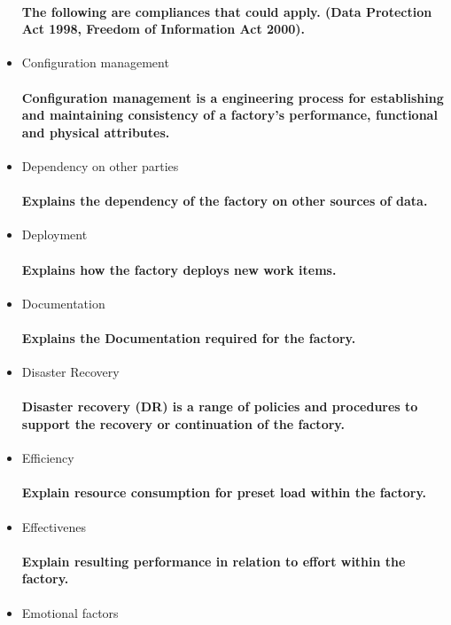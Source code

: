 \begin{itemize}
  \paragraph{The following are compliances that could apply. (Data Protection Act 1998, Freedom of Information Act 2000).}
  \item Configuration management
  \paragraph{Configuration management is a engineering process for establishing and maintaining consistency of a factory's performance, functional and physical attributes.}
  \item Dependency on other parties
  \paragraph{Explains the dependency of the factory on other sources of data.}
  \item Deployment
  \paragraph{Explains how the factory deploys new work items.}
  \item Documentation
  \paragraph{Explains the Documentation required for the factory.}
  \item Disaster Recovery
  \paragraph{Disaster recovery (DR) is a range of policies and procedures to support the recovery or continuation of the factory.}
  \item Efficiency
  \paragraph{Explain resource consumption for preset load within the factory.}
  \item Effectivenes
  \paragraph{Explain resulting performance in relation to effort within the factory.}
  \item Emotional factors

\end{itemize}
